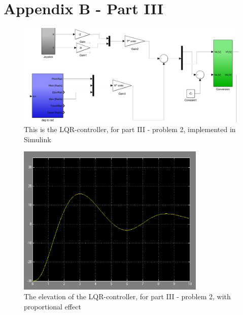 \section{Appendix B - Part III}

\begin{figure}[H]
    \centering
    \includegraphics[width=1.2\textwidth]{figures/P3p2-LQR_preg}
    \caption{This is the LQR-controller, for part III - problem 2, implemented in Simulink}
    \label{fig:P3p2-LQR_preg}
\end{figure}

\begin{figure}[H]
    \centering
    \includegraphics[width=0.8\textwidth]{figures/P3p2_elevation}
    \caption{The elevation of the LQR-controller, for part III - problem 2, with proportional effect}
    \label{fig:P3p2_elevation}
\end{figure}


